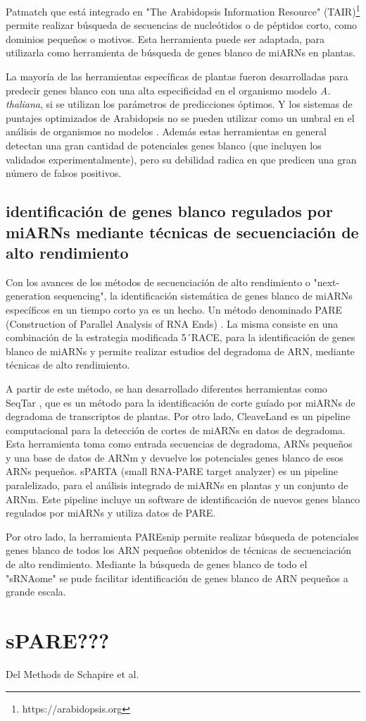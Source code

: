 Patmatch \citep{Yan01072005} que está integrado en "The Arabidopsis Information Resource" (TAIR)\footnote{https://arabidopsis.org} permite realizar búsqueda de secuencias de nucleótidos o de péptidos corto, como dominios pequeños o motivos.
Esta herramienta puede ser adaptada, para utilizarla como herramienta de búsqueda de genes blanco de miARNs en plantas.

La mayoría de las herramientas específicas de plantas fueron desarrolladas para predecir genes blanco con una alta especificidad en el organismo modelo \textit{A. thaliana}, si se utilizan los parámetros de predicciones óptimos.
Y los sistemas de puntajes optimizados de Arabidopsis no se pueden utilizar como un umbral en el análisis de organismos no modelos \citep{pmid24885295}.
Además estas herramientas en general detectan una gran cantidad de potenciales genes blanco (que incluyen los validados experimentalmente), pero su debilidad radica en que predicen una gran número de falsos positivos.

\subsection{identificación de genes blanco regulados por miARNs mediante técnicas de secuenciación de alto rendimiento}
Con los avances de los métodos de secuenciación de alto rendimiento o "next-generation sequencing", la identificación sistemática de genes blanco de miARNs específicos en un tiempo corto ya es un hecho.
Un método denominado PARE (Construction of Parallel Analysis of RNA Ends) \citep{pmid19247285}.
La misma consiste en una combinación de la estrategia modificada 5´RACE, para la identificación de genes blanco de miARNs y permite realizar estudios del degradoma de ARN, mediante técnicas de alto rendimiento.

A partir de este método, se han desarrollado diferentes herramientas como SeqTar \citep{pmid22140118}, que es un método para la identificación de corte guíado por miARNs de degradoma de transcriptos de plantas.
Por otro lado, CleaveLand \citep{pmid19017659} es un pipeline computacional para la detección de cortes de miARNs en datos de degradoma.
Esta herramienta toma como entrada secuencias de degradoma, ARNs pequeños y una base de datos de ARNm y devuelve los potenciales genes blanco de esos ARNs pequeños. 
sPARTA (small RNA-PARE target analyzer) \citep{pmid25120269} es un pipeline paralelizado, para el análisis integrado de miARNs en plantas y un conjunto de ARNm.
Este pipeline incluye un software de identificación de nuevos genes blanco regulados por miARNs y utiliza datos de PARE.

Por otro lado, la herramienta PAREsnip permite realizar búsqueda de potenciales genes blanco de todos los ARN pequeños obtenidos de técnicas de secuenciación de alto rendimiento.
Mediante la búsqueda de genes blanco de todo el "sRNAome" se pude facilitar identificación de genes blanco de ARN pequeños a grande escala.

\section{sPARE???}
Del Methods de Schapire et al.
